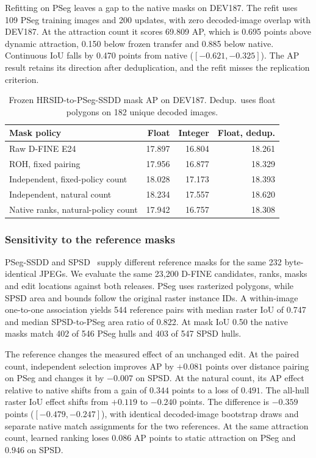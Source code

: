 \documentclass[journal]{IEEEtran}
\begin{document}
Refitting on PSeg leaves a gap to the native masks on DEV187. The refit uses 109 PSeg training images and 200 updates, with zero decoded-image overlap with DEV187. At the attraction count it scores 69.809 AP, which is 0.695 points above dynamic attraction, 0.150 below frozen transfer and 0.885 below native. Continuous IoU falls by 0.470 points from native (\([-0.621,-0.325]\)). The AP result retains its direction after deduplication, and the refit misses the replication criterion.

\begin{table}[t]
\centering
\caption{Frozen HRSID-to-PSeg-SSDD mask AP on DEV187. Dedup.\ uses float polygons on 182 unique decoded images.}
\label{tab:ssdd}
\footnotesize
\begin{tabular}{@{}lrrr@{}}
\toprule
Mask policy & Float & Integer & Float, dedup. \\
\midrule
Raw D-FINE E24 & 17.897 & 16.804 & 18.261 \\
ROH, fixed pairing & 17.956 & 16.877 & 18.329 \\
Independent, fixed-policy count & 18.028 & 17.173 & 18.393 \\
\midrule
Independent, natural count & 18.234 & 17.557 & 18.620 \\
Native ranks, natural-policy count & 17.942 & 16.757 & 18.308 \\
\bottomrule
\end{tabular}
\end{table}

\subsubsection{Sensitivity to the reference masks}
PSeg-SSDD and SPSD~\cite{slgsea} supply different reference masks for the same 232 byte-identical JPEGs. We evaluate the same 23,200 D-FINE candidates, ranks, masks and edit locations against both releases. PSeg uses rasterized polygons, while SPSD area and bounds follow the original raster instance IDs. A within-image one-to-one association yields 544 reference pairs with median raster IoU of 0.747 and median SPSD-to-PSeg area ratio of 0.822. At mask IoU 0.50 the native masks match 402 of 546 PSeg hulls and 403 of 547 SPSD hulls.

The reference changes the measured effect of an unchanged edit. At the paired count, independent selection improves AP by \(+0.081\) points over distance pairing on PSeg and changes it by \(-0.007\) on SPSD. At the natural count, its AP effect relative to native shifts from a gain of \(0.344\) points to a loss of \(0.491\). The all-hull raster IoU effect shifts from \(+0.119\) to \(-0.240\) points. The difference is \(-0.359\) points (\([-0.479,-0.247]\)), with identical decoded-image bootstrap draws and separate native match assignments for the two references. At the same attraction count, learned ranking loses \(0.086\) AP points to static attraction on PSeg and \(0.946\) on SPSD.
\end{document}
